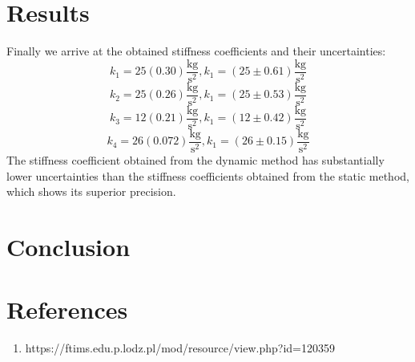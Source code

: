 \documentclass[a4paper,12pt,titlepage,bibliography=numbered]{article}
\begin{document}
\section{Results}
Finally we arrive at the obtained stiffness coefficients and their uncertainties:
\begin{equation}
    k_1 = 25(0.30) \mathrm{\frac{kg}{s^2}}, k_1 = (25 \pm 0.61) \mathrm{\frac{kg}{s^2}}
\end{equation}
\begin{equation}
    k_2 = 25(0.26) \mathrm{\frac{kg}{s^2}}, k_1 = (25 \pm 0.53) \mathrm{\frac{kg}{s^2}}
\end{equation}
\begin{equation}
    k_3 = 12(0.21) \mathrm{\frac{kg}{s^2}}, k_1 = (12 \pm 0.42) \mathrm{\frac{kg}{s^2}}
\end{equation}
\begin{equation}
    k_4 = 26(0.072) \mathrm{\frac{kg}{s^2}}, k_1 = (26 \pm 0.15) \mathrm{\frac{kg}{s^2}}
\end{equation}
The stiffness coefficient obtained from the dynamic method has substantially lower uncertainties than the stiffness coefficients obtained from the static method, which shows its superior precision.

\section{Conclusion}
\section{References}
\begin{enumerate}
    \item https://ftims.edu.p.lodz.pl/mod/resource/view.php?id=120359 \label{instruction}
\end{enumerate}
\end{document}
